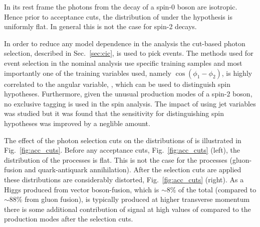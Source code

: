 In its rest frame the photons from the decay of a spin-0 boson are isotropic. Hence prior to acceptance cuts, the distribution of \costhetastar 
under the \zerop hypothesis is uniformly flat. In general this is not the case for spin-2 decays. 

In order to reduce any model dependence in the analysis the cut-based photon selection, described in Sec.~\ref{sec:cic}, is used to pick events. The \MVA methods used for event selection in the nominal analysis use specific \SM \MC training samples and most importantly one of the training variables used, namely $\cos(\phi_{1}-\phi_{2})$, is highly correlated to the angular variable, \costhetastar, which can be used to distinguish spin hypotheses. Furthermore, given the unusual production modes of a spin-2 boson, no exclusive tagging is used in the spin analysis. The impact of using jet variables was studied but it was found that the sensitivity for distinguishing spin hypotheses was improved by a neglible amount.

The effect of the photon selection cuts on the distributions of 
\abscostheta is illustrated in Fig.~\ref{fig:acc_cuts}. Before any acceptance cuts, Fig.~\ref{fig:acc_cuts} (left), the \abscostheta
distribution of the \zerop processes is flat. This is not the case for the \twomp processes (gluon-fusion and quark-antiquark annihilation). After the selection cuts are applied these distributions are considerably distorted, Fig.~\ref{fig:acc_cuts} (right). As a Higgs produced from vector boson-fusion, which is $\sim$8\% of the total (compared to $\sim$88\% from gluon fusion),  is typically produced at higher transverse momentum there is some additional contribution of \zerop signal at high values of \abscostheta compared to the \twomp production modes after the selection cuts.


